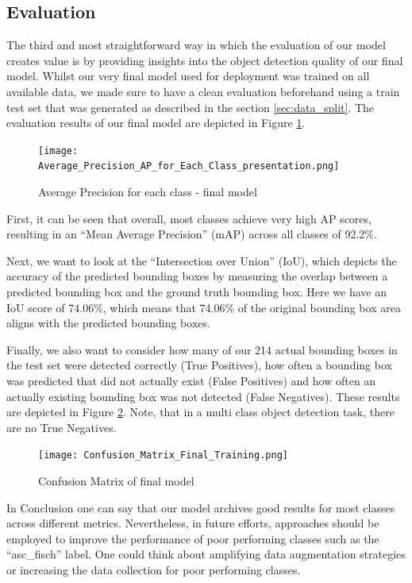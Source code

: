 \subsection{Evaluation}

The third and most straightforward way in which the evaluation of our model creates value is by providing insights into the object detection quality of our final model. Whilst our very final model used for deployment was trained on all available data, we made sure to have a clean evaluation beforehand using a train test set that was generated as described in the section \ref{sec:data_split}. The evaluation results of our final model are depicted in Figure \ref{fig:ap_final}. 

\begin{figure}[H]
    \centering
    \texttt{[image: Average\_Precision\_AP\_for\_Each\_Class\_presentation.png]}
    \caption{Average Precision for each class - final model}
    \label{fig:ap_final}
\end{figure}

First, it can be seen that overall, most classes achieve very high AP scores, resulting in an “Mean Average Precision” (mAP) across all classes of 92.2\%. 

Next, we want to look at the “Intersection over Union” (IoU), which depicts the accuracy of the predicted bounding boxes by measuring the overlap between a predicted bounding box and the ground truth bounding box. Here we have an IoU score of 74.06\%, which means that 74.06\% of the original bounding box area aligns with the predicted bounding boxes.

Finally, we also want to consider how many of our 214 actual bounding boxes in the test set were detected correctly (True Positives), how often a bounding box was predicted that did not actually exist (False Positives) and how often an actually existing bounding box was not detected (False Negatives). These results are depicted in Figure \ref{fig:cm_final}. Note, that in a multi class object detection task, there are no True Negatives. 

\begin{figure}[H]
    \centering
    \texttt{[image: Confusion\_Matrix\_Final\_Training.png]}
    \caption{Confusion Matrix of final model}
    \label{fig:cm_final}
\end{figure}

In Conclusion one can say that our model archives good results for most classes across different metrics. Nevertheless, in future efforts, approaches should be employed to improve the performance of poor performing classes such as the “asc\_fisch” label. One could think about amplifying data augmentation strategies or increasing the data collection for poor performing classes.

